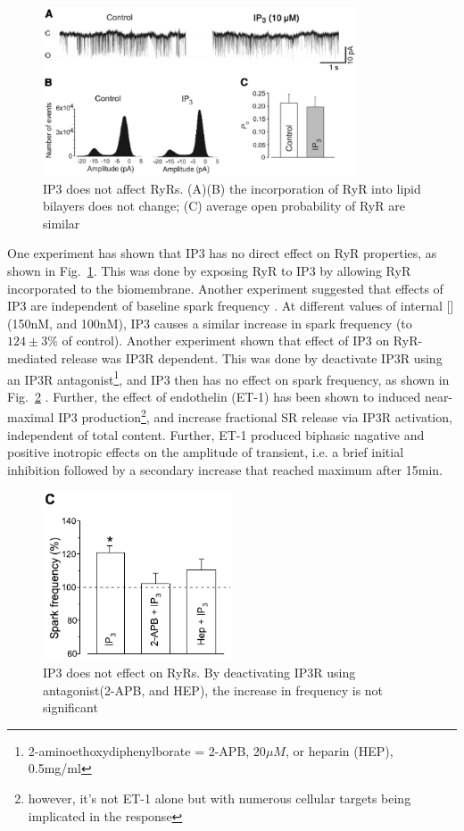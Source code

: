 \begin{figure}[hbt]
 \centerline{\includegraphics[height=5cm]{./images/IP3_RyR_relation.eps}}
 \caption{IP3 does not affect RyRs. (A)(B) the incorporation of RyR
   into lipid bilayers does not change; (C) average open probability
   of RyR are similar}
\label{fig:IP3_RyR}
\end{figure}

One experiment has shown that IP3 has no direct effect on RyR
properties, as shown in Fig.~\ref{fig:IP3_RyR}. This was done by
exposing RyR to IP3 by allowing RyR incorporated to the
biomembrane\citep{domeier2007ird}. Another experiment suggested that
effects of IP3 are independent of baseline spark frequency
\citep{domeier2007ird}. At different values of internal []
(150nM, and 100nM), IP3 causes a similar increase in  spark
frequency (to $124\pm 3\%$ of control).  Another experiment shown that
effect of IP3 on RyR-mediated  release was IP3R
dependent. This was done by deactivate IP3R using an IP3R
antagonist\footnote{2-aminoethoxydiphenylborate = 2-APB, 20$\mu M$, or
  heparin (HEP), 0.5mg/ml},
and IP3 then has no effect on  spark frequency, as shown in
Fig.~\ref{fig:IP3_RyR_effect} \citep{domeier2007ird}.  Further, the
effect of endothelin (ET-1) has been shown to induced near-maximal IP3
production\footnote{however, it's not ET-1 alone but with numerous
  cellular targets being implicated in the
  response\citep{domeier2007ird}}, and increase fractional SR
 release via IP3R activation, independent of total
 content. Further, ET-1 produced biphasic nagative and
positive inotropic effects on the amplitude of  transient,
i.e. a brief initial inhibition followed by a secondary increase that
reached maximum after 15min.

\begin{figure}[hbt]
 \centerline{\includegraphics[height=5cm]{./images/IP3_RyR.eps}}
\caption{IP3 does not effect on RyRs. By deactivating IP3R using
  antagonist(2-APB, and HEP), the increase in  frequency is
  not significant }
\label{fig:IP3_RyR_effect}
\end{figure}

